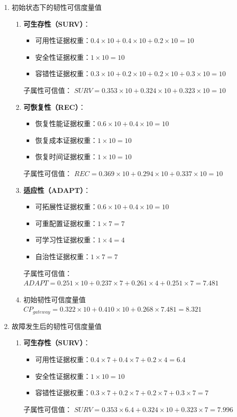 \documentclass{article}
\begin{document}
\begin{enumerate}
	\item 初始状态下的韧性可信度量值
	\begin{enumerate}
		\item \textbf{可生存性（SURV）}：
		\begin{itemize}
			\item 可用性证据权重：$0.4 \times 10 + 0.4 \times 10 + 0.2 \times 10 = 10$
			\item 安全性证据权重：$1 \times 10 = 10$
			\item 容错性证据权重：$0.3 \times 10 + 0.2 \times 10 + 0.2 \times 10 + 0.3 \times 10 = 10$
		\end{itemize}
		子属性可信值：
		$ SURV = 0.353 \times 10 + 0.324 \times 10 + 0.323 \times 10 = 10 $
		
		\item \textbf{可恢复性（REC）}：
		\begin{itemize}
			\item 恢复性能证据权重：$0.6 \times 10 + 0.4 \times 10 = 10$
			\item 恢复成本证据权重：$1 \times 10 = 10$
			\item 恢复时间证据权重：$1 \times 10 = 10$
		\end{itemize}
		子属性可信值：
		$ REC = 0.369 \times 10 + 0.294 \times 10 + 0.337 \times 10 = 10 $
		
		\item \textbf{适应性（ADAPT）}：
		\begin{itemize}
			\item 可拓展性证据权重：$0.6 \times 10 + 0.4 \times 10 = 10$
			\item 可重配置证据权重：$1 \times 7 = 7$
			\item 可学习性证据权重：$1 \times 4 = 4$
			\item 自治性证据权重：$1 \times 7 = 7$
		\end{itemize}
		子属性可信值：
		$ ADAPT = 0.251 \times 10 + 0.237 \times 7 + 0.261 \times 4 + 0.251 \times 7 = 7.481 $
		
		\item 初始韧性可信度量值 
		$ CP_{gateway} = 0.322 \times 10 + 0.410 \times 10 + 0.268 \times 7.481 = 8.321 $
	\end{enumerate}
	
	\item 故障发生后的韧性可信度量值
	\begin{enumerate}
		\item \textbf{可生存性（SURV）}：
		\begin{itemize}
			\item 可用性证据权重：$0.4 \times 7 + 0.4 \times 7 + 0.2 \times 4 = 6.4$
			\item 安全性证据权重：$1 \times 10 = 10$
			\item 容错性证据权重：$0.3 \times 7 + 0.2 \times 7 + 0.2 \times 7 + 0.3 \times 7 = 7$
		\end{itemize}
		子属性可信值：
		$ SURV = 0.353 \times 6.4 + 0.324 \times 10 + 0.323 \times 7 = 7.996 $
		

\end{enumerate}
\end{enumerate}
\end{document}
